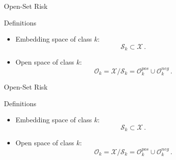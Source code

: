 \begin{frame}{Open-Set Risk}
    \begin{definitionblock}{Definitions}
        \begin{itemize}
            \item <1-> Embedding space of class $k$: 
            \[
                \mathcal{S}_k \subset \mathcal{X}\,.
            \]
            \item <2-> Open space of class $k$:
            \[
                \mathcal{O}_k = \mathcal{X}/\mathcal{S}_k = \mathcal{O}_k^{pos} \cup \mathcal{O}_k^{neg}\,.
            \]
        \end{itemize}
    \end{definitionblock}
\end{frame}

\begin{frame}{Open-Set Risk}
    \begin{minipage}{0.55\textwidth}
        \begin{definitionblock}{Definitions}
            \begin{itemize}
                \item <1-> Embedding space of class $k$: 
                \[
                    \mathcal{S}_k \subset \mathcal{X}\,.
                \]
                \item <2-> Open space of class $k$:
                \[
                    \mathcal{O}_k = \mathcal{X}/\mathcal{S}_k = \mathcal{O}_k^{pos} \cup \mathcal{O}_k^{neg}\,.
                \]
            \end{itemize}
        \end{definitionblock}
    \end{minipage}%
    \begin{minipage}{0.45\textwidth}
        \begin{figure}[h]
            \scalebox{.68}{
                \begin{tikzpicture}
    
                    \pgfplotsset{
                        scale only axis,
                    }
                    
                    \begin{axis}[
                        xmin=0, 
                        xmax=1.4, 
                        ymin=0, 
                        ymax=1.4,
                        x=4.3cm,
                        y=4.3cm,
                        ticks=none]
                        

\end{axis}
\end{tikzpicture}}
\end{figure}
\end{minipage}
\end{frame}

